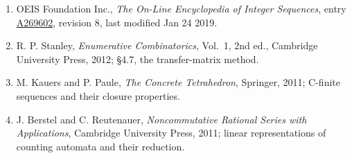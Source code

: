 \documentclass[11pt]{article}
\theoremstyle{definition}
\begin{document}
\begin{enumerate}

\item OEIS Foundation Inc., \emph{The On-Line Encyclopedia of Integer Sequences}, entry \href{https://oeis.org/A269602}{A269602}, revision 8, last modified Jan 24 2019.

\item R. P. Stanley, \emph{Enumerative Combinatorics}, Vol.~1, 2nd ed., Cambridge University Press, 2012; \S4.7, the transfer-matrix method.

\item M. Kauers and P. Paule, \emph{The Concrete Tetrahedron}, Springer, 2011; C-finite sequences and their closure properties.

\item J. Berstel and C. Reutenauer, \emph{Noncommutative Rational Series with Applications}, Cambridge University Press, 2011; linear representations of counting automata and their reduction.

\end{enumerate}
\end{document}
